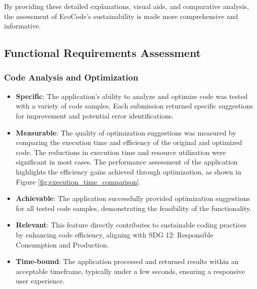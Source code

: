 \documentclass[conference,compsoc]{IEEEtran}
\begin{document}
By providing these detailed explanations, visual aids, and comparative analysis, the assessment of EcoCode's sustainability is made more comprehensive and informative.

\subsection{Functional Requirements Assessment}
\subsubsection{Code Analysis and Optimization}
\begin{itemize}
	\item \textbf{Specific}: The application's ability to analyze and optimize code was tested with a variety of code samples. Each submission returned specific suggestions for improvement and potential error identifications.

	\item \textbf{Measurable}: The quality of optimization suggestions was measured by comparing the execution time and efficiency of the original and optimized code. The reductions in execution time and resource utilization were significant in most cases. The performance assessment of the application highlights the efficiency gains achieved through optimization, as shown in Figure \ref{fig:execution_time_comparison}.

	\item \textbf{Achievable}: The application successfully provided optimization suggestions for all tested code samples, demonstrating the feasibility of the functionality.

	\item \textbf{Relevant}: This feature directly contributes to sustainable coding practices by enhancing code efficiency, aligning with SDG 12: Responsible Consumption and Production.

	\item \textbf{Time-bound}: The application processed and returned results within an acceptable timeframe, typically under a few seconds, ensuring a responsive user experience.
\end{itemize}
\end{document}
